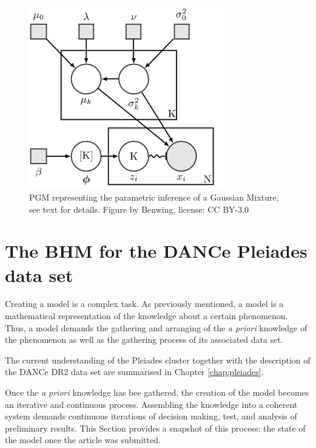 \begin{figure}[ht!]
\begin{center}
\includegraphics[height=8cm]{background/Figures/BGMM.png}
\caption{PGM representing the parametric inference of a Gaussian Mixture, see text for details. Figure by Benwing, license: CC BY-3.0}
\label{fig:pgmGMM}
\end{center}
\end{figure}

\section{The BHM for the DANCe Pleiades data set}
\label{sect:datamodelling}

Creating a model is a complex task. As previously mentioned, a model is a mathematical representation of the knowledge about a certain phenomenon. Thus, a model demands the gathering and arranging of the \emph{a priori} knowledge of the phenomenon as well as the gathering process of its associated data set. 

The current understanding of the Pleiades cluster together with the description of the DANCe DR2 data set are summarised in Chapter \ref{chap:pleiades}. 

Once the \emph{a priori} knowledge has bee gathered, the creation of the model becomes an iterative and continuous process. Assembling the knowledge into a coherent system demands continuous iterations of decision making, test, and analysis of preliminary results. This Section provides a snapshot of this process: the state of the model once the article \citet{Olivares2017} was submitted.

